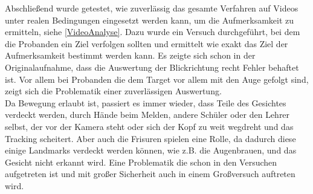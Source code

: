 Abschließend wurde getestet, wie zuverlässig das gesamte Verfahren auf Videos unter realen Bedingungen eingesetzt werden kann, um die Aufmerksamkeit zu ermitteln, siehe \autoref{VideoAnalyse}. Dazu wurde ein Versuch durchgeführt, bei dem die Probanden ein Ziel verfolgen sollten und ermittelt wie exakt das Ziel der Aufmerksamkeit bestimmt werden kann. Es zeigte sich schon in der Originalaufnahme, dass die Auswertung der Blickrichtung recht Fehler behaftet ist. Vor allem bei Probanden die dem Target vor allem mit den Auge gefolgt sind, zeigt sich die Problematik einer zuverlässigen Auswertung.\\

Da Bewegung erlaubt ist, passiert es immer wieder, dass Teile des Gesichtes verdeckt werden, durch Hände beim Melden, andere Schüler oder den Lehrer selbst, der vor der Kamera steht oder sich der Kopf zu weit wegdreht und das Tracking scheitert. Aber auch die Frisuren spielen eine Rolle, da dadurch diese einige Landmarks verdeckt werden können, wie z.B. die Augenbrauen, und das Gesicht nicht erkannt wird. Eine Problematik die schon in den Versuchen aufgetreten ist und mit großer Sicherheit auch in einem Großversuch auftreten wird.
